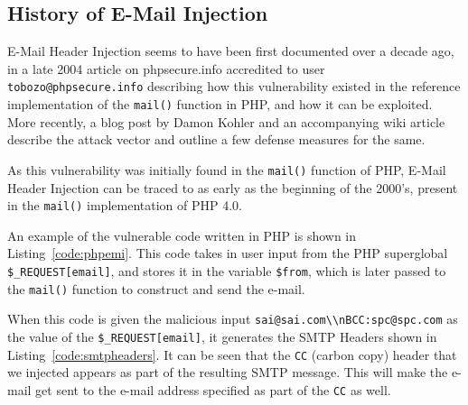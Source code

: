 \subsection{History of E-Mail Injection}

E-Mail Header Injection seems to have been first documented over a decade ago, in a late 2004 article on phpsecure.info \cite{Tobozo} accredited to user \lstinline|tobozo@phpsecure.info| describing how this vulnerability existed in the reference implementation of the \texttt{mail()} function in PHP, and how it can be exploited. More recently, a blog post by Damon Kohler \cite{DK} and an accompanying wiki article \cite{Injection} describe the attack vector and outline a few defense measures for the same.

As this vulnerability was initially found in the \texttt{mail()} function of PHP, E-Mail Header Injection can be traced to as early as the beginning of the 2000's, present in the \texttt{mail()} implementation of PHP 4.0. 

An example of the vulnerable code written in PHP is shown in Listing~\ref{code:phpemi}. This code takes in user input from the PHP superglobal \texttt{\$\_REQUEST[\textquotesingle email\textquotesingle]}, and stores it in the variable \texttt{\$from}, which is later passed to the \texttt{mail()} function to construct and send the e-mail.

	
When this code is given the malicious input \texttt{\lstinline{sai@sai.com\\nBCC:spc@spc.com}} as the value of the \texttt{\$\_REQUEST[\textquotesingle email\textquotesingle]}, it generates the SMTP Headers shown in Listing~\ref{code:smtpheaders}. It can be seen that the \texttt{CC} (carbon copy) header that we injected appears as part of the resulting SMTP message. This will make the e-mail get sent to the e-mail address specified as part of the \texttt{CC} as well.

%
